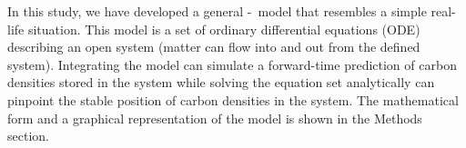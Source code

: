 \documentclass[../thesis.tex]{subfiles} %
\begin{document}

In this study, we have developed a general \phy-\bac\ model that resembles a simple real-life situation.  This model is a set of ordinary differential equations (ODE) describing an open system (matter can flow into and out from the defined system).  Integrating the model can simulate a forward-time prediction of carbon densities stored in the system while solving the equation set analytically can pinpoint the stable position of carbon densities in the system.  The mathematical form and a graphical representation of the model is shown in the Methods section.
\end{document}
